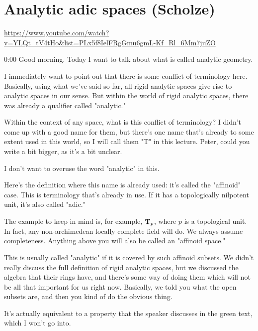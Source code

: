 
\section{\ufs Analytic adic spaces (Scholze)}

\url{https://www.youtube.com/watch?v=YLQt_tV4tHo&list=PLx5f8IelFRgGmu6gmL-Kf_Rl_6Mm7juZO}
\renewcommand{\yt}[2]{\href{https://www.youtube.com/watch?v=YLQt_tV4tHo&list=PLx5f8IelFRgGmu6gmL-Kf_Rl_6Mm7juZO&t=#1}{#2}}
\vspace{1em}

\begin{unfinished}{0:00}
Good morning. Today I want to talk about what is called analytic geometry.

I immediately want to point out that there is some conflict of terminology here. Basically, using what we've said so far, all rigid analytic spaces give rise to analytic spaces in our sense. But within the world of rigid analytic spaces, there was already a qualifier called "analytic." 

Within the context of any space, what is this conflict of terminology?  I didn't come up with a good name for them, but there's one name that's already to some extent used in this world, so I will call them "T" in this lecture. Peter, could you write a bit bigger, as it's a bit unclear. 

I don't want to overuse the word "analytic" in this.

Here's the definition where this name is already used: it's called the "affinoid" case. This is terminology that's already in use. If it has a topologically nilpotent unit, it's also called "adic."

The example to keep in mind is, for example, $\mathbf T_p$, where $p$ is a topological unit. In fact, any non-archimedean locally complete field will do. We always assume completeness. Anything above you will also be called an "affinoid space."

This is usually called "analytic" if it is covered by such affinoid subsets. We didn't really discuss the full definition of rigid analytic spaces, but we discussed the algebra that their rings have, and there's some way of doing them which will not be all that important for us right now. Basically, we told you what the open subsets are, and then you kind of do the obvious thing.

It's actually equivalent to a property that the speaker discusses in the green text, which I won't go into.


\end{unfinished}
